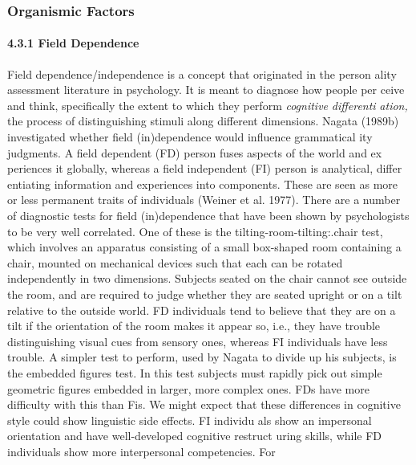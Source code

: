 \subsubsection[Organismic Factors]{Organismic Factors}
\paragraph[4.3.1 Field Dependence]{4.3.1 Field Dependence}
\begin{styleStandard}
Field dependence/independence is a concept that originated in the person\- ality assessment literature in psychology. It is meant to diagnose how people per\- ceive and think, specifically the extent to which they perform \textit{cognitive}\textit{ }\textit{differenti\-}\textit{ }\textit{ation,}\textit{ }the process of distinguishing stimuli along different dimensions. Nagata (1989b) investigated whether field (in)dependence would influence grammatical\- ity judgments. A field dependent (FD) person fuses aspects of the world and ex\- periences it globally, whereas a field independent (FI) person is analytical, differ\- entiating information and experiences into components. These are seen as more or less permanent traits of individuals (Weiner et al. 1977). There are a number of diagnostic tests for field (in)dependence that have been shown by psychologists to be very well correlated. One of these is the tilting-room-tilting:.chair test, which involves an apparatus consisting of a small box-shaped room containing a chair, mounted on mechanical devices such that each can be rotated independently in two dimensions. Subjects seated on the chair cannot see outside the room, and are required to judge whether they are seated upright or on a tilt relative to the outside world. FD individuals tend to believe that they are on a tilt if the orientation of the room makes it appear so, i.e., they have trouble distinguishing visual cues from sensory ones, whereas FI individuals have less trouble. A simpler test to perform, used by Nagata to divide up his subjects, is the embedded figures test. In this test subjects must rapidly pick out simple geometric figures embedded in larger, more complex ones. FDs have more difficulty with this than Fis. We might expect that these differences in cognitive style could show linguistic side effects. FI individu\- als show an impersonal orientation and have well-developed cognitive restruct\- uring skills, while FD individuals show more interpersonal competencies. For
\end{styleStandard}


